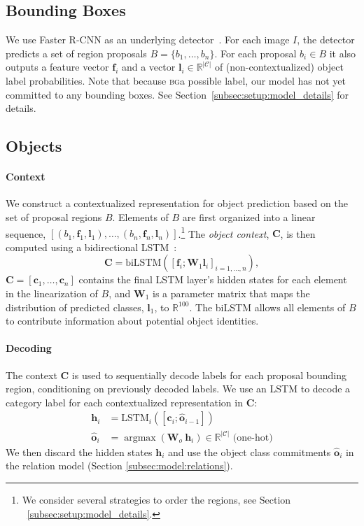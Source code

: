 \documentclass[10pt,twocolumn,letterpaper]{article}
\DeclareMathOperator*{\argmax}{argmax}
\DeclareMathOperator*{\softmax}{softmax}
\newcommand{\R}{\mathbb{R}}   %
\newcommand{\card}[1]{\left\vert{#1}\right\vert}  %
\newcommand{\bg}{\textsc{bg}}  %
\newcommand{\term}[1]{\emph{#1}}  %
\newcommand{\vect}[1]{\mathbf{#1}}   %
\newcommand{\mat}[1]{\mathbf{#1}}    %
\begin{document}
\subsection{Bounding Boxes}\label{subsec:model:bounding_boxes}

We use Faster R-CNN as an underlying detector~\cite{ren_faster_2015}.
For each image $I$, the detector predicts a set of region proposals $B = \{ b_1, \ldots, b_n \}$.
For each proposal $b_i \in B$ it also outputs a feature vector $\vect{f}_i$ and a vector $\vect{l}_i \in \R^{\card{\mathcal{C}}}$ of (non-contextualized) object label probabilities.
Note that because \bg\is a possible label, our model has not yet committed to any bounding boxes.
See Section~\ref{subsec:setup:model_details} for details.

\subsection{Objects}\label{subsec:model:objects}\paragraph{Context}
We construct a contextualized representation for object prediction based on the set of proposal regions $B$.
Elements of $B$ are first organized into a linear sequence, $[(b_1,\vect{f}_1,\vect{l}_1), \ldots, (b_n,\vect{f}_n, \vect{l}_n)]$.\footnote{We consider several strategies to order the regions, see Section ~\ref{subsec:setup:model_details}.}
The \term{object context}, $\mat{C}$, is then computed using a bidirectional LSTM~\cite{Hochreiter:1997:LSM:1246443.1246450}:
\begin{equation}
\mat{C} = \text{biLSTM}(
  [\vect{f}_i; \mat{W}_1\vect{l}_i]_{i=1,\ldots,n}
),
\end{equation}$\mat{C} = [\vect{c}_1, \ldots, \vect{c}_n]$ contains the final LSTM layer's hidden states for each element in the linearization of $B$, and $\mathbf{W}_1$ is a parameter matrix that maps the distribution of predicted classes, $\vect{l}_1$, to $\R^{100}$. The biLSTM allows all elements of $B$ to contribute information about potential object identities.

\paragraph{Decoding}
The context $\mat{C}$ is used to sequentially decode labels for each proposal bounding region, conditioning on previously decoded labels.
We use an LSTM to decode a category label for each contextualized representation in $\mat{C}$:
\begin{align}
    \vect{h}_i &= \text{LSTM}_i\left( [\vect{c}_{i}; \vect{\hat{o}}_{i-1}] \right)\\
    \label{eqn:max_o}
    \vect{\hat{o}}_i &= \argmax{\left( \mat{W}_o~\vect{h}_i \right)} \in \R^{\card{\mathcal{C}}} \text{ (one-hot)}
\end{align}
We then discard the hidden states $\vect{h}_i$ and use the object class commitments $\vect{\hat{o}}_i$ in the relation model (Section \ref{subsec:model:relations}).
\end{document}
